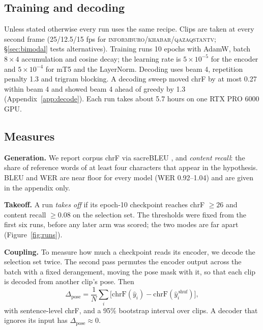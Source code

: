 \documentclass[11pt,twocolumn,a4paper]{article}
\newcommand{\cpl}{\Delta_{\text{pose}}}
\newcommand{\src}[1]{\textsc{#1}}
\newcommand{\ib}{\src{informburo}}
\newcommand{\kh}{\src{khabar}}
\newcommand{\qz}{\src{qazaqstantv}}
\renewcommand{\paragraph}[1]{\par\smallskip\noindent\textbf{#1}\hspace{0.5em}}
\begin{document}
\subsection{Training and decoding}

Unless stated otherwise every run uses the same recipe. Clips are taken at every second frame (25/12.5/15 fps for \ib/\kh/\qz; \S\ref{sec:bimodal} tests alternatives). Training runs 10 epochs with AdamW, batch $8\times4$ accumulation and cosine decay; the learning rate is $5\times10^{-5}$ for the encoder and $5\times10^{-4}$ for mT5 and the LayerNorm. Decoding uses beam 4, repetition penalty 1.3 and trigram blocking. A decoding sweep moved chrF by at most 0.27 within beam 4 and showed beam 4 ahead of greedy by 1.3 (Appendix~\ref{app:decode}). Each run takes about 5.7 hours on one RTX PRO 6000 GPU.

\subsection{Measures}
\label{sec:measures}

\paragraph{Generation.}
We report corpus chrF \citep{popovic2015chrf} via sacreBLEU \citep{post2018sacrebleu}, and \emph{content recall}: the share of reference words of at least four characters that appear in the hypothesis. BLEU and WER are near floor for every model (WER 0.92--1.04) and are given in the appendix only.

\paragraph{Takeoff.}
A run \emph{takes off} if its epoch-10 checkpoint reaches chrF $\geq 26$ and content recall $\geq 0.08$ on the selection set. The thresholds were fixed from the first six runs, before any later arm was scored; the two modes are far apart (Figure~\ref{fig:runs}).

\paragraph{Coupling.}
To measure how much a checkpoint reads its encoder, we decode the selection set twice. The second pass permutes the encoder output across the batch with a fixed derangement, moving the pose mask with it, so that each clip is decoded from another clip's pose. Then
\begin{equation}
\cpl = \frac{1}{N}\sum_{i} \big[\mathrm{chrF}(\hat y_i) - \mathrm{chrF}(\hat y_i^{\,\text{shuf}})\big],
\end{equation}
with sentence-level chrF, and a 95\% bootstrap interval over clips. A decoder that ignores its input has $\cpl \approx 0$.
\end{document}
